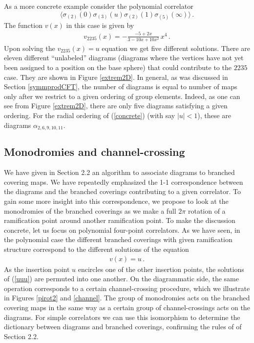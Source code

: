 \documentclass[letterpaper]{JHEP3}
\def\a{\alpha}
\def\be{\begin{equation}}
\def\ee{\end{equation}}
\def\a{\alpha}
\def\be{\begin{eqnarray}}
\def\ee{\end{eqnarray}}
\begin{document}
As a more concrete example consider the polynomial correlator 
\begin{equation} \label{concrete}
\langle \sigma_{(2)} (0) \sigma_{(3)} (u) \sigma_{(2)} (1)  \sigma_{(5)} (\infty) \rangle \,.
\end{equation}
 The function $v(x)$
in this case is given by
\be
v_{2235}(x) = -\frac{ -5 + 2 x}{3 - 10 x + 10 x^2}\,x^4\,.
\ee
Upon solving the $v_{2235}(x)=u$ equation we get
five different solutions.
There are eleven different ``unlabeled''
diagrams (diagrams where the vertices have  not yet been assigned to a position on the base sphere)
that could contribute to the $2235$ case. They are shown in Figure \ref{extrem2D}.
In general, as was discussed in Section \ref{symmprodCFT}, the number of
diagrams is equal to number of maps only after we restrict to a given ordering of group elements.
Indeed, as one can see from Figure \ref{extrem2D}, there are only five diagrams satisfying
a given ordering. For the radial ordering of (\ref{concrete}) (with say $|u| < 1$), 
 these are diagrams
$\a_{2,6,9,10,11}$.

\subsection{Monodromies and channel-crossing}\label{modspace}

We have given in Section 2.2 an algorithm to associate
diagrams to branched covering maps. We have repeatedly emphasized
the 1-1 correspondence between the diagrams 
and the branched coverings  contributing to a given correlator. To gain some more insight into
 this correspondence, we propose to look at the monodromies of the branched coverings
 as we make a full $ 2\pi$ rotation of a  ramification point around another ramification point. 
 To make the discussion concrete,
 let us  focus on polynomial four-point  correlators. As we have seen, in the polynomial case
 the different branched coverings with given ramification structure
 correspond to the different solutions of the equation
 \be\label{uuu}
v(x)=u \, .
\ee
As the insertion point $u$ encircles one of the other insertion points, the solutions of (\ref{uuu}) 
 are permuted into one another.  On the diagrammatic side, the same operation corresponds to a
 certain channel-crossing procedure, which we illustrate 
  in Figures \ref{pirot2} and \ref{channel}. The group of monodromies acts on the branched covering maps
  in the same way as a certain group of channel-crossings acts on the diagrams.
 For simple correlators we can use this isomorphism to determine the dictionary between diagrams and branched coverings, 
 confirming the rules of  of Section 2.2.
\end{document}
